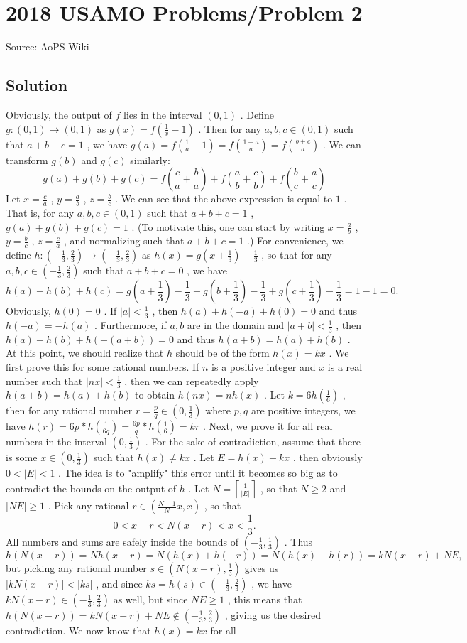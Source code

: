 \documentclass[12pt]{article}
\begin{document}
\section*{{2018 USAMO Problems/Problem 2}}
Source: AoPS Wiki

\subsection*{Solution}
Obviously, the output of $f$ lies in the interval $(0,1)$ . Define $g:(0,1)\to(0,1)$ as $g(x)=f\left(\frac1x-1\right)$ . Then for any $a,b,c\in(0,1)$ such that $a+b+c=1$ , we have $g(a)=f\left(\frac1a-1\right)=f\left(\frac{1-a}a\right)=f\left(\frac{b+c}a\right)$ . We can transform $g(b)$ and $g(c)$ similarly: \[g(a)+g(b)+g(c)=f\left(\frac ca+\frac ba\right)+f\left(\frac ab+\frac cb\right)+f\left(\frac bc+\frac ac\right)\] Let $x=\frac ca$ , $y=\frac ab$ , $z=\frac bc$ . We can see that the above expression is equal to $1$ . That is, for any $a,b,c\in(0,1)$ such that $a+b+c=1$ , $g(a)+g(b)+g(c)=1$ . (To motivate this, one can start by writing $x=\frac ab$ , $y=\frac bc$ , $z=\frac ca$ , and normalizing such that $a+b+c=1$ .) For convenience, we define $h:\left(-\frac13,\frac23\right)\to\left(-\frac13,\frac23\right)$ as $h(x)=g\left(x+\frac13\right)-\frac13$ , so that for any $a,b,c\in\left(-\frac13,\frac23\right)$ such that $a+b+c=0$ , we have \[h(a)+h(b)+h(c)=g\left(a+\frac13\right)-\frac13+g\left(b+\frac13\right)-\frac13+g\left(c+\frac13\right)-\frac13=1-1=0.\] Obviously, $h(0)=0$ . If $|a|<\frac13$ , then $h(a)+h(-a)+h(0)=0$ and thus $h(-a)=-h(a)$ . Furthermore, if $a,b$ are in the domain and $|a+b|<\frac13$ , then $h(a)+h(b)+h(-(a+b))=0$ and thus $h(a+b)=h(a)+h(b)$ . At this point, we should realize that $h$ should be of the form $h(x)=kx$ . We first prove this for some rational numbers. If $n$ is a positive integer and $x$ is a real number such that $|nx|<\frac13$ , then we can repeatedly apply $h(a+b)=h(a)+h(b)$ to obtain $h(nx)=nh(x)$ . Let $k=6h\left(\frac16\right)$ , then for any rational number $r=\frac pq\in\left(0,\frac13\right)$ where $p,q$ are positive integers, we have $h(r)=6p*h\left(\frac1{6q}\right)=\frac{6p}q*h\left(\frac16\right)=kr$ . Next, we prove it for all real numbers in the interval $\left(0,\frac13\right)$ . For the sake of contradiction, assume that there is some $x\in\left(0,\frac13\right)$ such that $h(x)\ne kx$ . Let $E=h(x)-kx$ , then obviously $0<|E|<1$ . The idea is to "amplify" this error until it becomes so big as to contradict the bounds on the output of $h$ . Let $N=\left\lceil\frac1{|E|}\right\rceil$ , so that $N\ge2$ and $|NE|\ge1$ . Pick any rational $r\in\left(\frac{N-1}Nx,x\right)$ , so that \[0<x-r<N(x-r)<x<\frac13.\] All numbers and sums are safely inside the bounds of $\left(-\frac13,\frac13\right)$ . Thus \[h(N(x-r))=Nh(x-r)=N(h(x)+h(-r))=N(h(x)-h(r))=kN(x-r)+NE,\] but picking any rational number $s\in\left(N(x-r),\frac13\right)$ gives us $|kN(x-r)|<|ks|$ , and since $ks=h(s)\in\left(-\frac13,\frac23\right)$ , we have $kN(x-r)\in\left(-\frac13,\frac23\right)$ as well, but since $NE\ge1$ , this means that $h(N(x-r))=kN(x-r)+NE\notin\left(-\frac13,\frac23\right)$ , giving us the desired contradiction. We now know that $h(x)=kx$ for all 
\end{document}
